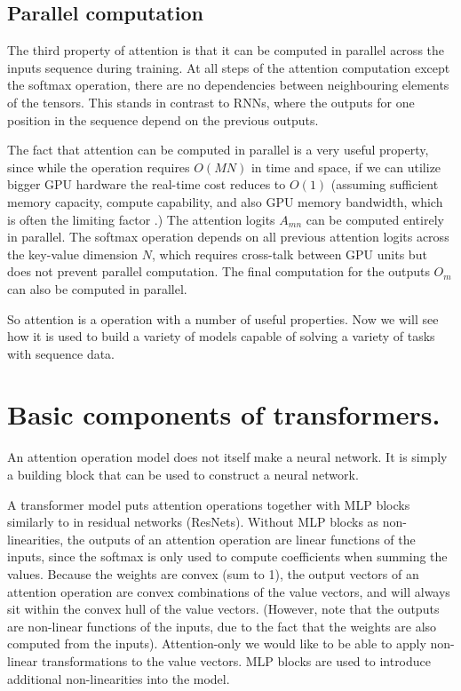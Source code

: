 \subsection{Parallel computation}

The third property of attention is that it can be computed in parallel across the inputs sequence during training. At all steps of the attention computation except the softmax operation, there are no dependencies between neighbouring elements of the tensors. This stands in contrast to RNNs, where the outputs for one position in the sequence depend on the previous outputs.

The fact that attention can be computed in parallel is a very useful property, since while the operation requires $O(MN)$ in time and space, if we can utilize bigger GPU hardware the real-time cost reduces to $O(1)$ (assuming sufficient memory capacity, compute capability, and also GPU memory bandwidth, which is often the limiting factor \cite{multi-query-attn}.) The attention logits $A_{mn}$ can be computed entirely in parallel. The softmax operation depends on all previous attention logits across the key-value dimension $N$, which requires cross-talk between GPU units but does not prevent parallel computation. The final computation for the outputs $O_m$ can also be computed in parallel.

So attention is a operation with a number of useful properties. Now we will see how it is used to build a variety of models capable of solving a variety of tasks with sequence data.

\section{Basic components of transformers.}

An attention operation model does not itself make a neural network. It is simply a building block that can be used to construct a neural network.

A transformer model puts attention operations together with MLP blocks similarly to in residual networks (ResNets). Without MLP blocks as non-linearities, the outputs of an attention operation are linear functions of the inputs, since the softmax is only used to compute coefficients when summing the values. Because the weights are convex (sum to 1), the output vectors of an attention operation are convex combinations of the value vectors, and will always sit within the convex hull of the value vectors. (However, note that the outputs are non-linear functions of the inputs, due to the fact that the weights are also computed from the inputs). Attention-only we would like to be able to apply non-linear transformations to the value vectors. MLP blocks are used to introduce additional non-linearities into the model.

